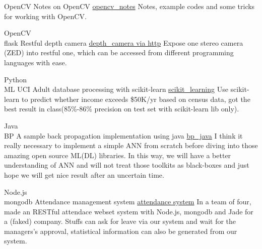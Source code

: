 \documentclass[utf8]{twentysecondcv} %
\begin{document}
\begin{twenty}

    \twentyitem
        {OpenCV}
        {Notes on OpenCV}
        {\href{https://github.com/MiaoDX/opencv\_projects/}{opencv\_notes}}
        {}
        {Notes, example codes and some tricks for working with OpenCV.}


    \twentyitem
        {OpenCV \\ flask}
        {Restful depth camera}
        {\href{https://github.com/MiaoDX/depth\_camera}{depth\_camera via http}}
        {}
        {Expose one stereo camera (ZED) into restful one, which can be accessed from different programming languages with ease.}


    \twentyitem
        {Python \\ ML}
        {UCI Adult database processing with scikit-learn}
        {\href{https://github.com/MiaoDX/scikit\_learning/}{scikit\_learning}}
        {}
        {Use scikit-learn to predict whether income exceeds \$50K/yr based on census data, got the best result in class(85\%-86\% precision on test set with scikit-learn lib only).}

    \twentyitem
        {Java \\ BP}
        {A sample back propagation implementation using java}
        {\href{https://github.com/MiaoDX/bp_java}{bp\_java}}
        {}                
        {I think it really necessary to implement a simple ANN from scratch before diving into those amazing open source ML(\/DL) libraries. In this way, we will have a better understanding of ANN and will not treat those toolkits as black-boxes and just hope we will get nice result after an uncertain time.}

    \twentyitem
        {Node.js \\ mongodb}
        {Attendance management system}
        {\href{https://github.com/SEAPC2016/attendance}{attendance system}}
        {}
        {In a team of four, made an RESTful attendace webset system with Node.js, mongodb and Jade for a (faked) company. Stuffs can ask for leave via our system and wait for the managers's approval, statistical information can also be generated from our system.}

        


\end{twenty}
\end{document}
